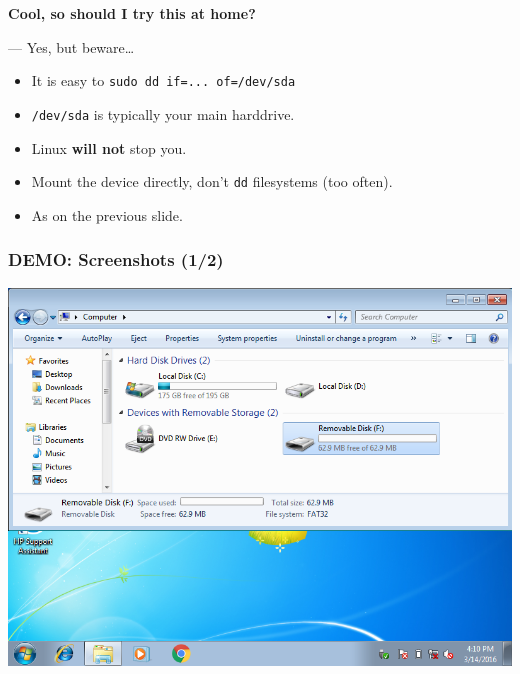\begin{frame}

\begin{center}

\Large \textbf{Cool, so should I try this at home?}

\end{center}

\begin{flushright}

--- Yes, but beware\ldots

\end{flushright}

\begin{itemize}

\item It is easy to \texttt{sudo dd if=... of=/dev/sda}

\item \texttt{/dev/sda} is typically your main harddrive.

\item Linux \textbf{will not} stop you.

\item Mount the device directly, don't \texttt{dd} filesystems (too often).

\item As on the previous slide.

\end{itemize}

\end{frame}


\begin{frame}

\frametitle{DEMO: Screenshots (1/2)}

\begin{center}

\includegraphics[scale=0.4]{figures/windows-mycomputer}

\end{center}

\end{frame}


